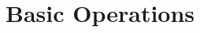 \documentclass[main.tex]{subfiles}
\begin{document}
\section{Basic Operations}
\label{sec:basic_operations}
\end{document}
